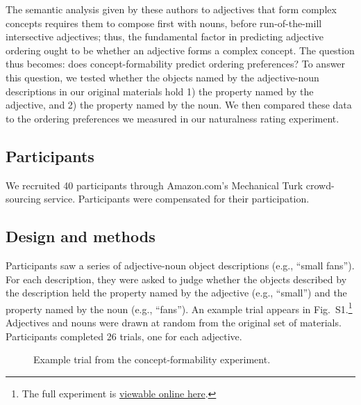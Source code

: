 \documentclass[12pt]{article}
\begin{document}
The semantic analysis given by these authors to adjectives that form complex concepts requires them to compose first with nouns, before run-of-the-mill intersective adjectives; thus, the fundamental factor in predicting adjective ordering ought to be whether an adjective forms a complex concept. The question thus becomes: does concept-formability predict ordering preferences? To answer this question, we tested whether the objects named by the adjective-noun descriptions in our original materials hold 1) the property named by the adjective, and 2) the property named by the noun. We then compared these data to the ordering preferences we measured in our naturalness rating experiment.

\subsection{Participants}

We recruited 40 participants through Amazon.com's Mechanical Turk crowd-sourcing service. Participants were compensated for their participation.

\subsection{Design and methods}

Participants saw a series of adjective-noun object descriptions (e.g., ``small fans''). For each description, they were asked to judge whether the objects described by the description held the property named by the adjective (e.g., ``small'') and the property named by the noun (e.g., ``fans''). An example trial appears in Fig.~S1.\footnote{The full experiment is \href{http://web.stanford.edu/~scontras/adjective_ordering/experiments/9-concept-formability/concept-formability.html}{viewable online here}.} Adjectives and nouns were drawn at random from the original set of materials. Participants completed 26 trials, one for each adjective. 

\begin{figure}[h]
	\centering
	\caption{Example trial from the concept-formability experiment.}\label{concept-trial}
\end{figure}
\end{document}
